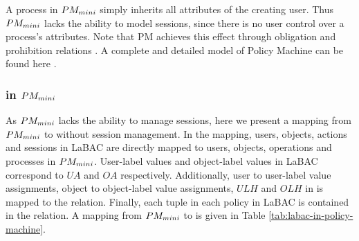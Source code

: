 

A process in $PM_{mini}{}$ simply inherits all attributes of the creating user. Thus $PM_{mini}{}$ lacks the ability to model sessions, since there is no user control over a process's attributes.  Note that PM achieves this effect through obligation and prohibition relations \cite{INCITS526}. A complete and detailed model of Policy Machine can be found here \cite{INCITS526,policy-machine}.


 \subsubsection{\hlabac{} in $PM_{mini}{}$}
 
 
 
As $PM_{mini}{}$ lacks the ability to manage sessions, here we present a mapping from $PM_{mini}{}$ to \hlabac{} without session management. In the mapping, users, objects, actions and sessions in LaBAC are directly mapped to users, objects, operations and processes in $PM_{mini}{}$.  User-label values and object-label values in LaBAC correspond to $UA$ and $OA$ respectively. Additionally,  user to user-label value assignments, object to object-label value assignments,  $ULH$ and $OLH$ in \hlabac{} is mapped to the \assignment{} relation. Finally, each tuple in each policy in LaBAC is contained in the \association{} relation. A mapping from  $PM_{mini}{}$ to \hlabac{} is given in Table \ref{tab:labac-in-policy-machine}. 
